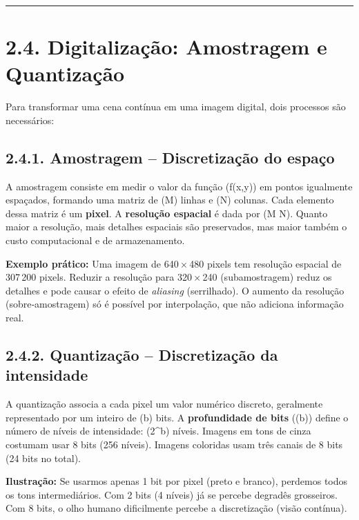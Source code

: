 \documentclass[
  portuguese,
  letterpaper,
  openany,
  oneside,
  12pt,
  a4paper]{book}
\begin{document}
\begin{tcolorbox}
\begin{center}\rule{0.5\linewidth}{0.5pt}\end{center}

\section{2.4. Digitalização: Amostragem e
Quantização}\label{digitalizauxe7uxe3o-amostragem-e-quantizauxe7uxe3o}

Para transformar uma cena contínua em uma imagem digital, dois processos
são necessários:

\subsection{2.4.1. Amostragem -- Discretização do
espaço}\label{amostragem-discretizauxe7uxe3o-do-espauxe7o}

A amostragem consiste em medir o valor da função (f(x,y)) em pontos
igualmente espaçados, formando uma matriz de (M) linhas e (N) colunas.
Cada elemento dessa matriz é um \textbf{pixel}. A \textbf{resolução
espacial} é dada por (M \times N). Quanto maior a resolução, mais
detalhes espaciais são preservados, mas maior também o custo
computacional e de armazenamento.

\textbf{Exemplo prático:} Uma imagem de 640\,×\,480 pixels tem resolução
espacial de 307\,200 pixels. Reduzir a resolução para 320\,×\,240
(subamostragem) reduz os detalhes e pode causar o efeito de
\emph{aliasing} (serrilhado). O aumento da resolução (sobre‐amostragem)
só é possível por interpolação, que não adiciona informação real.

\subsection{2.4.2. Quantização -- Discretização da
intensidade}\label{quantizauxe7uxe3o-discretizauxe7uxe3o-da-intensidade}

A quantização associa a cada pixel um valor numérico discreto,
geralmente representado por um inteiro de (b) bits. A
\textbf{profundidade de bits} ((b)) define o número de níveis de
intensidade: (2\^{}b) níveis. Imagens em tons de cinza costumam usar 8
bits (256 níveis). Imagens coloridas usam três canais de 8 bits (24 bits
no total).

\textbf{Ilustração:} Se usarmos apenas 1 bit por pixel (preto e branco),
perdemos todos os tons intermediários. Com 2 bits (4 níveis) já se
percebe degradês grosseiros. Com 8 bits, o olho humano dificilmente
percebe a discretização (visão contínua).


\end{tcolorbox}
\end{document}
